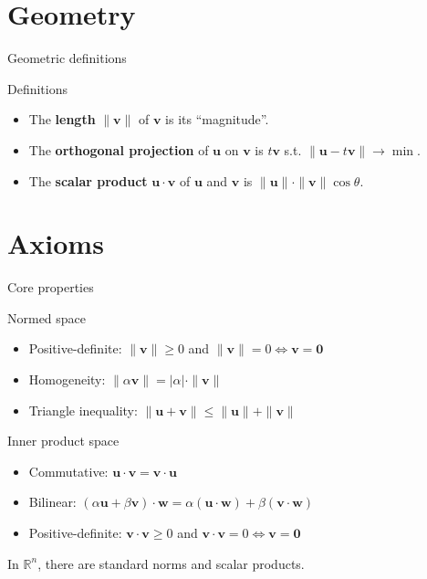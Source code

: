 \documentclass[10pt]{beamer}
\begin{document}
\section{Geometry}
\begin{frame}{Geometric definitions}
    \begin{center}
        
    \end{center}
    \begin{block}{Definitions}
        \begin{itemize}
            \item The \textbf{length} $\|\mathbf v\|$ of $\mathbf v$ is its ``magnitude''.
            \item The \textbf{orthogonal projection} of $\mathbf u$ on $\mathbf v$ is $t \mathbf v$ s.t. $\|\mathbf u - t\mathbf v\| \to \min$.
            \item The \textbf{scalar product} $\mathbf u \cdot \mathbf v$ of $\mathbf u$ and $\mathbf v$ is $\|\mathbf u\| \cdot \|\mathbf v\| \cos \theta$.
        \end{itemize}
    \end{block}
\end{frame}

\section{Axioms}
\begin{frame}{Core properties}
    \begin{block}{Normed space}
        \begin{itemize}
            \item Positive-definite: $\|\mathbf v\| \geq 0$ and $\|\mathbf v\| = 0 \iff \mathbf v = \mathbf 0$
            \item Homogeneity: $\|\alpha \mathbf v\| = |\alpha| \cdot \|\mathbf v\|$
            \item Triangle inequality: $\|\mathbf u + \mathbf v\| \leq \|\mathbf u\| + \|\mathbf v\|$
        \end{itemize}
    \end{block}
    \begin{block}{Inner product space}
    \begin{itemize}
        \item Commutative: $\mathbf u \cdot \mathbf v = \mathbf v \cdot \mathbf u$
        \item Bilinear: $(\alpha \mathbf u + \beta \mathbf v) \cdot \mathbf w = \alpha(\mathbf u \cdot \mathbf w) + \beta (\mathbf v \cdot \mathbf w)$
        \item Positive-definite: $\mathbf v \cdot \mathbf v \geq 0$ and $\mathbf v \cdot \mathbf v = 0 \iff \mathbf v = \mathbf 0$
    \end{itemize}
    \end{block}
    In $\mathbb R^n$, there are standard norms and scalar products.
\end{frame}
\end{document}
